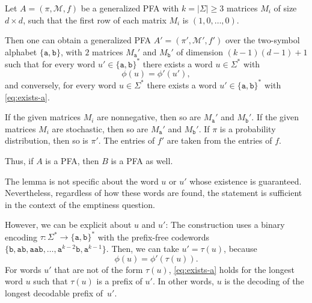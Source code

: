 \documentclass[a4paper,cleveref, autoref, thm-restate]{lipics-v2021}
\begin{document}
\begin{lemma}%
\label{lem:reduce-to-2}
    Let $A=
(\pi,\mathcal{M},f)$
  be a generalized PFA with $k=|\Sigma|\ge3$ matrices $M_i$ of size
  $d\times d$, such that the first row of each matrix $M_i$ is
  $(1,0,\ldots,0)$.

  Then
    one can obtain
    a generalized PFA $A'=(\pi',\mathcal{M}',f')$
    over the two-symbol alphabet $\{\mathtt{a,b}\}$,
 with
    $2$ %
 matrices
 $M_{\mathtt{a}}'$ and
 $M_{\mathtt{b}}'$
 of dimension
 $(k-1)(d-1)+1$ such that
 for every word $u'
 \in  \{\mathtt{a,b}\}^*$ there exists a word $u\in\Sigma^*$ with
 \begin{equation}\label{eq:exists-a}
   \phi(u)=\phi'(u'),
 \end{equation}
and conversely, 
for every word
$u\in\Sigma^*$ there exists a word 
$u'
 \in  \{\mathtt{a,b}\}^*$ 
 with
 \eqref{eq:exists-a}.



 If the given matrices $M_i$ are nonnegative, then so are
$M_{\mathtt{a}}'$ and
$M_{\mathtt{b}}'$.
 If the given matrices $M_i$ are stochastic, then so are
$M_{\mathtt{a}}'$ and
$M_{\mathtt{b}}'$.
If $\pi$ is a probability distribution, then so is $\pi'$.
The entries of $f'$ are taken from the entries of $f$.

Thus, if $A$ is a PFA, then $B$ is a PFA as well.
 
\end{lemma}
The lemma is not specific about the word $u$ or $u'$ whose existence is
guaranteed.
Nevertheless, regardless of how these words are found,
the statement
is sufficient in the context of the emptiness
question.

However,
we can be explicit about $u$ and $u'$:
The construction uses a binary encoding
  $\tau\colon\Sigma^*\to
  \{\mathtt{a,b}\}^*
  $ with the prefix-free codewords
  $\{
 \mathtt{b,ab},\mathtt{aab},\allowbreak
 \ldots,\allowbreak\mathtt{a}^{k-2}\mathtt{b}
,\allowbreak\mathtt{a}^{k-1}
\}$.
Then, we can take $u'=\tau(u)$, because
 \begin{displaymath}
   \phi(u)=\phi'(\tau(u)).
 \end{displaymath}
 For words $u'$ that are not of the form $\tau(u)$,
 \eqref{eq:exists-a} holds for the longest word $u$ such that
  $\tau(u)$ is a prefix of $u'$. In other words, $u$ is the decoding
  of the longest decodable prefix of~$u'$.
  
\end{document}
